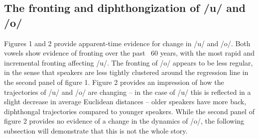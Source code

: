 \documentclass[PWPL]{article}
\begin{document}
\subsection{The fronting and diphthongization of /u/ and /o/}
Figures 1 and 2 provide apparent-time evidence for change in /u/ and /o/. Both vowels show evidence of fronting over the past ~60 years, with the most rapid and incremental fronting affecting /u/. The fronting of /o/ appears to be less regular, in the sense that speakers are less tightly clustered around the regression line in the second panel of figure 1. Figure 2 provides an impression of how the trajectories of /u/ and /o/ are changing -- in the case of /u/ this is reflected in a slight decrease in average Euclidean distances -- older speakers have more back, diphthongal trajectories compared to younger speakers. While the second panel of figure 2 provides no evidence of a change in the dynamics of /o/, the following subsection will demonstrate that this is not the whole story.
\end{document}
